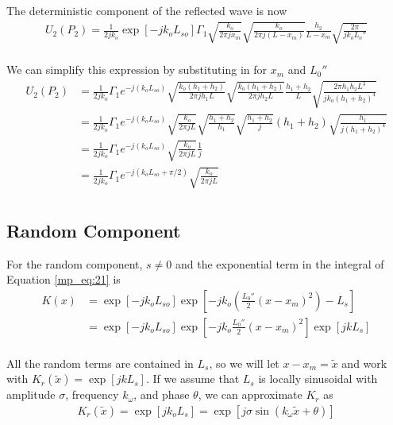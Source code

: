\noindent The deterministic component of the reflected wave is now
\begin{equation}
\begin{aligned}
U_2(P_2)=\frac{1}{2jk_o}\exp[-jk_oL_{so}]\Gamma_1 \sqrt{\frac{k_o}{2\pi jx_m}}\sqrt{\frac{k_o}{2\pi j (L-x_m)}}\frac{h_2}{L-x_m}\sqrt{\frac{2\pi}{jk_oL_o''}}\\
\end{aligned}
\label{mp_eq:24}
\end{equation}

\noindent We can simplify this expression by substituting in for $x_m$ and $L_0''$
\begin{equation}
\begin{aligned}
U_2(P_2)&= \frac{1}{2jk_o}\Gamma_1e^{-j\left(k_oL_{so}\right)}\sqrt{\frac{k_o(h_1+h_2)}{2\pi j h_1L}}\sqrt{\frac{k_o(h_1+h_2)}{2\pi j h_2L}}\frac{h_1+h_2}{L}\sqrt{\frac{2\pi h_1h_2L^3}{jk_o(h_1+h_2)^4}}\\
&=\frac{1}{2jk_o}\Gamma_1e^{-j\left(k_oL_{so}\right)}\sqrt{\frac{k_o}{2\pi j L}}\sqrt{\frac{h_1+h_2}{h_1}}\sqrt{\frac{h_1+h_2}{j}}(h_1+h_2)\sqrt{\frac{ h_1}{j(h_1+h_2)^4}} \\
&= \frac{1}{2jk_o}\Gamma_1e^{-j\left(k_oL_{so}\right)}\sqrt{\frac{k_o}{2\pi j L}}\frac{1}{j} \\
&= \frac{1}{2jk_o}\Gamma_1e^{-j\left(k_oL_{so}+\pi/2\right)}\sqrt{\frac{k_o}{2\pi jL}} \\
\end{aligned}
\label{mp_eq:27}
\end{equation}

\subsection{Random Component}
For the random component, $s \neq 0$ and the exponential term in the integral of Equation \ref{mp_eq:21} is
\begin{equation}
\begin{aligned}
K(x) &= \exp\left[-jk_oL_{so}\right]\exp\left[-jk_o\left(\frac{L_0''}{2}\left(x-x_m\right)^2 \right) -L_s\right] \\
&=\exp\left[-jk_oL_{so}\right]\exp\left[-jk_o\frac{L_0''}{2}\left(x-x_m\right)^2\right]\exp\left[jkL_s\right] \\
\end{aligned}
\label{mp_eq:29}
\end{equation}
\renewcommand{\baselinestretch}{2} \small\normalsize

All the random terms are contained in $L_s$, so we will let $x-x_m = \tilde{x}$ and work with $K_r(\tilde{x}) = \exp\left[jkL_s \right]$. If we assume that $L_s$ is locally sinusoidal with amplitude $\sigma$, frequency $k_{\omega}$, and phase $\theta$, we can approximate $K_r$ as 
\begin{equation}
\begin{aligned}
K_r(\tilde{x}) = \exp\left[jk_oL_s\right] =\exp\left[j\sigma \sin\left(k_{\omega} \tilde{x} + \theta\right) \right]
\end{aligned}
\label{mp_eq:30}
\end{equation}
\renewcommand{\baselinestretch}{2} \small\normalsize


